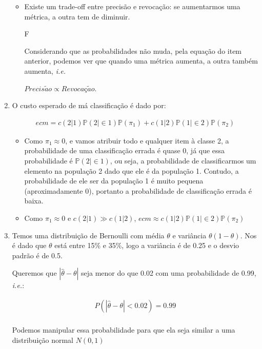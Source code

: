 \documentclass[11pt,a4paper]{book}
\begin{document}
\begin{enumerate}
\begin{itemize}
			\item Existe um trade-off entre precisão e revocação: se aumentarmos uma métrica, a outra tem de diminuir.
			
			F
			
			Considerando que as probabilidades não muda, pela equação do item anterior, podemos ver que quando uma métrica aumenta, a outra também aumenta, \textit{i.e.}
			
			$Precis\tilde{a}o \propto Revoca\mbox{ç}\tilde{a}o$.
		\end{itemize}
		
		\item
		O custo esperado de má classificação é dado por:
		
		\begin{eqnarray*}
			ecm=c(2|1)\mathbb{P}(2|\in 1)\mathbb{P}(\pi_1)+c(1|2)\mathbb{P}(1|\in 2)\mathbb{P}(\pi_2)
		\end{eqnarray*}
		
		\begin{itemize}
			\item 
			Como $\pi_1\approx 0$, e vamos atribuir todo e qualquer item à classe 2, a probabilidade de uma classificação errada é quase 0, já que essa probabilidade é $\mathbb{P}(2|\in 1)$, ou seja, a probabilidade de classificarmos um elemento na população 2 dado que ele é da população 1.
			Contudo, a probabilidade de ele ser da população 1 é muito pequena (aproximadamente 0), portanto a probabilidade de classificação errada é baixa.
			
			\item
			Como $\pi_1\approx 0$ e $c(2|1)\gg c(1|2)$, $ecm\approx c(1|2)\mathbb{P}(1|\in 2)\mathbb{P}(\pi_2)$
		\end{itemize}
		
		\item
		Temos uma distribuição de Bernoulli com média $\theta$ e variância $\theta(1-\theta)$.
		Nos é dado que $\theta$ está entre 15\% e 35\%, logo a variância é de 0.25 e o desvio padrão é de 0.5.
		
		Queremos que $|\hat{\theta}-\theta|$ seja menor do que 0.02 com uma probabilidade de 0.99, \textit{i.e.}:
		
		\begin{eqnarray*}
			P(|\hat{\theta}-\theta|<0.02)=0.99\\
		\end{eqnarray*}
		
		Podemos manipular essa probabilidade para que ela seja similar a uma distribuição normal $N(0,1)$
		

\end{enumerate}
\end{document}
